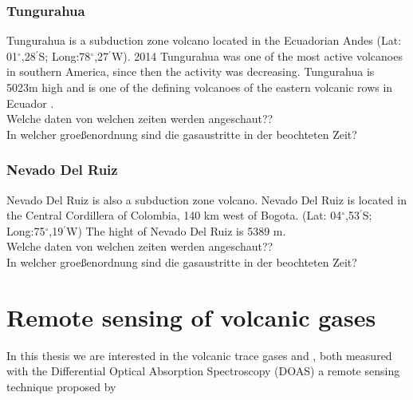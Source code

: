 \documentclass  [
  paper    = a4,
  BCOR     = 10mm,
  twoside,
  fontsize = 12pt,
  fleqn,
  toc      = bibnumbered,
  toc      = listofnumbered,
  numbers  = noendperiod,
  headings = normal,
  listof   = leveldown,
  version  = 3.03
]                                       {scrreprt}
\begin{document}
	

	\subsection*{Tungurahua}
	Tungurahua is a subduction zone volcano located in the Ecuadorian Andes (Lat: 01$^{\circ}$,28$^{'}$S; Long:78$^{\circ}$,27$^{'}$W). 2014 Tungurahua was one of the most active volcanoes in southern America, since then the activity was decreasing. Tungurahua is 5023m high and is one of the defining volcanoes of the eastern volcanic rows in Ecuador \citep{hall1999tungurahua}.\\
	Welche daten von welchen zeiten werden angeschaut??\\
	In welcher groeßenordnung sind die gasaustritte in der beochteten Zeit?
		
	\subsection*{Nevado Del Ruiz}
	Nevado Del Ruiz is also a subduction zone volcano. 	Nevado Del Ruiz  is located in the Central Cordillera of Colombia, 140 km west of Bogota.
	(Lat: 04$^{\circ}$,53$^{'}$S; Long:75$^{\circ}$,19$^{'}$W) 
	The hight of Nevado Del Ruiz is 5389 m.
	\\
	Welche daten von welchen zeiten werden angeschaut??\\
	In welcher groeßenordnung sind die gasaustritte in der beochteten Zeit?
	 
	\chapter{Remote sensing of volcanic gases}
	In this thesis we are interested in the volcanic trace gases  and , both measured with the Differential Optical Absorption Spectroscopy (DOAS) a remote sensing technique proposed by \cite{platt2008differential}\\
	
\end{document}

